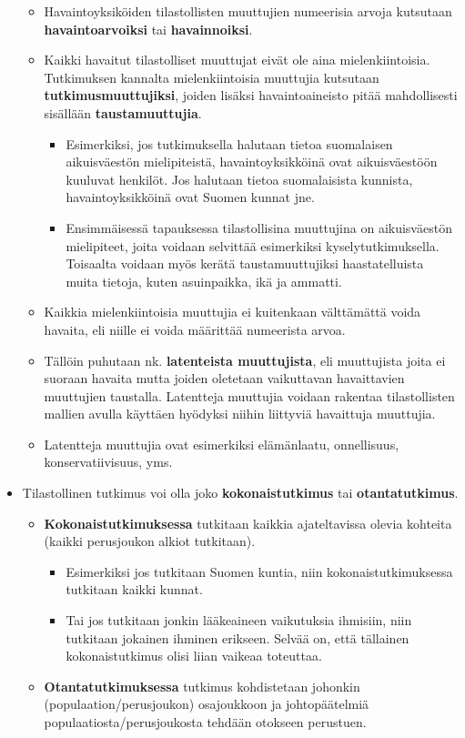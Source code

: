\documentclass[
]{book}
\providecommand{\tightlist}{%
  \setlength{\itemsep}{0pt}\setlength{\parskip}{0pt}}
\begin{document}
\begin{itemize}
  \begin{itemize}
  \tightlist
  \item
    Havaintoyksiköiden tilastollisten muuttujien numeerisia arvoja kutsutaan \textbf{havaintoarvoiksi} tai \textbf{havainnoiksi}.
  \item
    Kaikki havaitut tilastolliset muuttujat eivät ole aina mielenkiintoisia. Tutkimuksen kannalta mielenkiintoisia muuttujia kutsutaan \textbf{tutkimusmuuttujiksi}, joiden lisäksi havaintoaineisto pitää mahdollisesti sisällään \textbf{taustamuuttujia}.

    \begin{itemize}
    \tightlist
    \item
      Esimerkiksi, jos tutkimuksella halutaan tietoa suomalaisen aikuisväestön mielipiteistä, havaintoyksikköinä ovat aikuisväestöön kuuluvat henkilöt. Jos halutaan tietoa suomalaisista kunnista, havaintoyksikköinä ovat Suomen kunnat jne.
    \item
      Ensimmäisessä tapauksessa tilastollisina muuttujina on aikuisväestön mielipiteet, joita voidaan selvittää esimerkiksi kyselytutkimuksella. Toisaalta voidaan myös kerätä taustamuuttujiksi haastatelluista muita tietoja, kuten asuinpaikka, ikä ja ammatti.
    \end{itemize}
  \item
    Kaikkia mielenkiintoisia muuttujia ei kuitenkaan välttämättä voida havaita, eli niille ei voida määrittää numeerista arvoa.
  \item
    Tällöin puhutaan nk. \textbf{latenteista muuttujista}, eli muuttujista joita ei suoraan havaita mutta joiden oletetaan vaikuttavan havaittavien muuttujien taustalla. Latentteja muuttujia voidaan rakentaa tilastollisten mallien avulla käyttäen hyödyksi niihin liittyviä havaittuja muuttujia.
  \item
    Latentteja muuttujia ovat esimerkiksi elämänlaatu, onnellisuus, konservatiivisuus, yms.
  \end{itemize}
\item
  Tilastollinen tutkimus voi olla joko \textbf{kokonaistutkimus} tai \textbf{otantatutkimus}.

  \begin{itemize}
  \tightlist
  \item
    \textbf{Kokonaistutkimuksessa} tutkitaan kaikkia ajateltavissa olevia kohteita (kaikki perusjoukon alkiot tutkitaan).

    \begin{itemize}
    \tightlist
    \item
      Esimerkiksi jos tutkitaan Suomen kuntia, niin kokonaistutkimuksessa tutkitaan kaikki kunnat.
    \item
      Tai jos tutkitaan jonkin lääkeaineen vaikutuksia ihmisiin, niin tutkitaan jokainen ihminen erikseen. Selvää on, että tällainen kokonaistutkimus olisi liian vaikeaa toteuttaa.
    \end{itemize}
  \item
    \textbf{Otantatutkimuksessa} tutkimus kohdistetaan johonkin (populaation/perusjoukon) osajoukkoon ja johtopäätelmiä populaatiosta/perusjoukosta tehdään otokseen perustuen.


\end{itemize}
\end{itemize}
\end{document}
